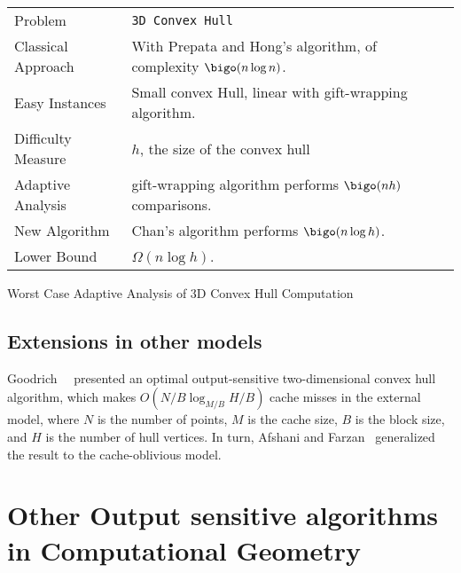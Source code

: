 \begin{adaptiveanalysis}
  \begin{tabular}{@{\bf}p{}p{}}
    Problem            & {\tt 3D Convex Hull}\\               
    Classical Approach & With Prepata and Hong's algorithm, of complexity $\bigo(n\log n)$. \\
    Easy Instances     & Small convex Hull, linear with gift-wrapping algorithm.\\
    Difficulty Measure & $h$, the size of the convex hull\\
    Adaptive Analysis  & gift-wrapping algorithm  performs $\bigo(nh)$ comparisons. \\
    New Algorithm      & Chan's algorithm  performs $\bigo(n\log h)$. \\
    Lower Bound        & $\Omega( n \log h)$. \\
  \end{tabular}
  \caption{Worst Case Adaptive Analysis of 3D Convex Hull Computation}
  \label{tab:planarConvexHull}
\end{adaptiveanalysis}


\subsection{Extensions in other models}
\label{sec:extens-other-models}



Goodrich~\etal~\cite{externalMemoryComputationalGeometry} presented an
optimal output-sensitive two-dimensional convex hull algorithm, which
makes $O(N/B \log_{M/B} H/B)$ cache misses in the external model,
where $N$ is the number of points, $M$ is the cache size, $B$ is the
block size, and $H$ is the number of hull vertices.
%
In turn, Afshani and
Farzan~\cite{cacheObliviousOutputSensitiveTwoDimensionalConvexHull}
generalized the result to the cache-oblivious model.


\section{Other Output sensitive algorithms in Computational Geometry}
\label{sec:other-outp-sens}

